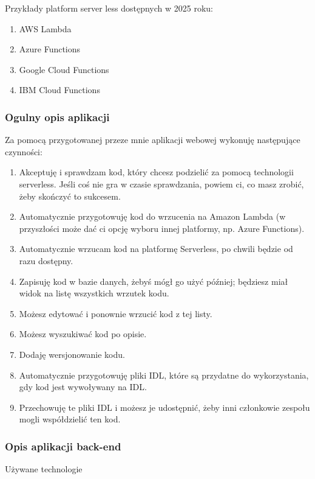 \documentclass[runningheads,12pt]{llncs}
\begin{document}
Przykłady platform server less dostępnych w 2025 roku:

\begin{enumerate}
    \item AWS Lambda 
    \item Azure Functions 
    \item Google Cloud Functions 
    \item IBM Cloud Functions 
\end{enumerate}

\subsubsection{Ogulny opis aplikacji}

Za pomocą przygotowanej przeze mnie aplikacji webowej wykonuję następujące czynności:

\begin{enumerate}
    \item Akceptuję i sprawdzam kod, który chcesz podzielić za pomocą technologii serverless. Jeśli coś nie gra w czasie sprawdzania, powiem ci, co masz zrobić, żeby skończyć to sukcesem.
    \item Automatycznie przygotowuję kod do wrzucenia na Amazon Lambda (w przyszłości może dać ci opcję wyboru innej platformy, np. Azure Functions).
    \item Automatycznie wrzucam kod na platformę Serverless, po chwili będzie od razu dostępny.
    \item Zapisuję kod w bazie danych, żebyś mógł go użyć później; będziesz miał widok na listę wszystkich wrzutek kodu.
    \item Możesz edytować i ponownie wrzucić kod z tej listy.
    \item Możesz wyszukiwać kod po opisie.
    \item Dodaję wersjonowanie kodu.
    \item Automatycznie przygotowuję pliki IDL, które są przydatne do wykorzystania, gdy kod jest wywoływany na IDL.
    \item Przechowuję te pliki IDL i możesz je udostępnić, żeby inni członkowie zespołu mogli współdzielić ten kod.
\end{enumerate}

\subsubsection{Opis aplikacji back-end}

Używane technologie
\end{document}
